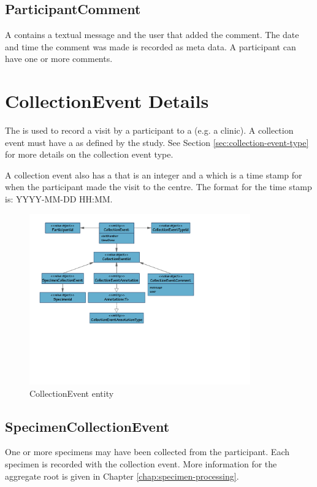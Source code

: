 \subsection*{ParticipantComment}
A  contains a textual message and the user
that added the comment. The date and time the comment was made is recorded as
meta data. A participant can have one or more comments.

\section{CollectionEvent Details}
The  is used to record a visit by a participant
to a  (e.g. a clinic). A collection event must have a
 as defined by the study. See Section
\ref{sec:collection-event-type} for more details on the collection event type.

A collection event also has a  that is an integer and a
 which is a time stamp for when the participant made the
visit to the centre. The format for the time stamp is: YYYY-MM-DD HH:MM.

\begin{figure}[H]
  \centering
  \includegraphics[trim={10mm 66mm 70mm 10mm}, clip,
    width=0.85\textwidth]{images/collection-event}
  \caption{CollectionEvent entity}
  \label{fig:collection-event}
\end{figure}

\subsection*{SpecimenCollectionEvent}
One or more specimens may have been collected from the participant. Each
specimen is recorded with the collection event. More information for the
 aggregate root is given in Chapter
\ref{chap:specimen-processing}.

